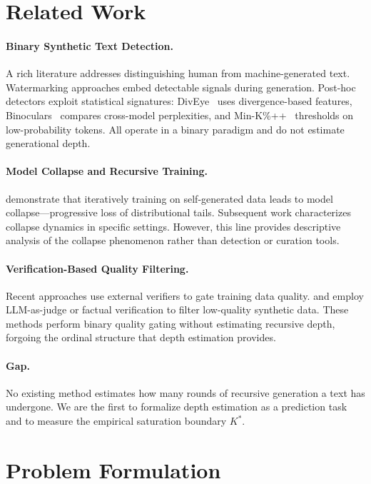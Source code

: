 \documentclass[11pt,a4paper]{article}
\begin{document}
\section{Related Work}

\paragraph{Binary Synthetic Text Detection.} A rich literature addresses distinguishing human from machine-generated text. Watermarking approaches embed detectable signals during generation. Post-hoc detectors exploit statistical signatures: DivEye~\cite{diveye} uses divergence-based features, Binoculars~\cite{binoculars} compares cross-model perplexities, and Min-K\%++~\cite{minkpp} thresholds on low-probability tokens. All operate in a binary paradigm and do not estimate generational depth.

\paragraph{Model Collapse and Recursive Training.} \citet{shumailov2024ai} demonstrate that iteratively training on self-generated data leads to model collapse---progressive loss of distributional tails. Subsequent work characterizes collapse dynamics in specific settings. However, this line provides descriptive analysis of the collapse phenomenon rather than detection or curation tools.

\paragraph{Verification-Based Quality Filtering.} Recent approaches use external verifiers to gate training data quality. \citet{feng2024} and \citet{yi2024} employ LLM-as-judge or factual verification to filter low-quality synthetic data. These methods perform binary quality gating without estimating recursive depth, forgoing the ordinal structure that depth estimation provides.

\paragraph{Gap.} No existing method estimates how many rounds of recursive generation a text has undergone. We are the first to formalize depth estimation as a prediction task and to measure the empirical saturation boundary $K^*$.

\section{Problem Formulation}
\end{document}
